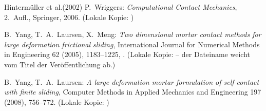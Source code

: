 \documentclass[a4paper,11pt]{article}
\begin{document}
\begin{thebibliography}{Hintermüller et al.(2002)}
 P.~Wriggers: \emph{Computational Contact Mechanics}, 2.~Aufl., Springer, 2006. (Lokale Kopie: )

 B.~Yang, T.~A.~Laursen, X.~Meng: \emph{Two dimensional mortar contact methods for large deformation frictional sliding}, International Journal for Numerical Methods in Engineering 62 (2005), 1183--1225, . (Lokale Kopie:  -- der Dateiname weicht vom Titel der Ver\"offentlichung ab.)

 B.~Yang, T.~A.~Laursen: \emph{A large deformation mortar formulation of self contact with finite sliding}, Computer Methods in Applied Mechanics and Engineering 197 (2008), 756--772. (Lokale Kopie: )

\end{thebibliography}
\end{document}
